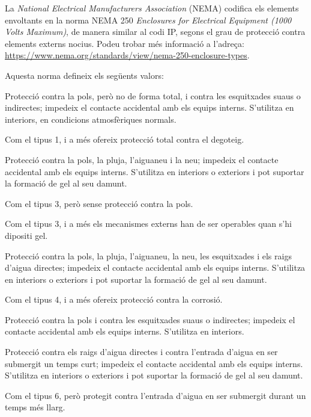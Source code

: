 La \textit{National Electrical Manufacturers Association} (NEMA)
codifica els elements envoltants en la norma NEMA 250 \textit{Enclosures for Electrical Equipment (1000 Volts Maximum)}, de manera similar al codi IP, segons el  grau de protecció contra elements externs nocius. Podeu trobar més informació a l'adreça: \href{https://www.nema.org/standards/view/nema-250-enclosure-types}{https:/\!\!/www.nema.org/standards/view/nema-250-enclosure-types}.

Aquesta norma defineix els següents valors:

\begin{list}{}
	{\setlength{\labelwidth}{10mm} \setlength{\leftmargin}{15mm} \setlength{\labelsep}{5mm}}
	\item[1] Protecció contra la pols, però no de forma total, i contra les esquitxades suaus o indirectes; impedeix el contacte accidental amb els equips interns. S'utilitza en interiors, en condicions atmosfèriques normals.
	\item[2] Com el tipus 1, i a més ofereix protecció total contra el degoteig.
	\item[3] Protecció contra la pols, la pluja, l'aiguaneu i la neu; impedeix el contacte accidental amb els equips interns. S'utilitza en interiors o exteriors i pot suportar la formació de gel al seu damunt.
	\item[3R] Com el tipus 3, però sense protecció contra la pols.
	\item[3S] Com el tipus 3, i a més els mecanismes externs han de ser operables quan s'hi dipositi gel.
	\item[4] Protecció contra la pols, la pluja, l'aiguaneu, la neu, les esquitxades i els raigs d'aigua directes; impedeix el contacte accidental amb els equips interns. S'utilitza en interiors o exteriors i pot suportar la formació de gel al seu damunt.
	\item[4X] Com el tipus 4, i a més ofereix protecció contra la corrosió.
	\item[5] Protecció contra la pols i contra les esquitxades suaus o indirectes; impedeix el contacte accidental amb els equips interns. S'utilitza en interiors.
	\item[6] Protecció contra els raigs d'aigua directes i contra l'entrada d'aigua en ser submergit un temps curt; impedeix el contacte accidental amb els equips interns. S'utilitza en interiors o exteriors i pot suportar la formació de gel al seu damunt.
	\item[6P] Com el tipus 6, però protegit contra l'entrada d'aigua en ser submergit durant un temps més llarg.

\end{list}
